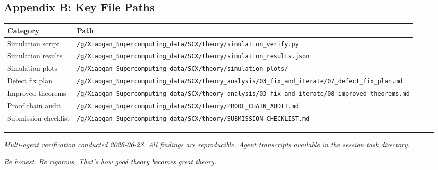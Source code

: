 \documentclass[
  12pt,
]{ctexart}
\begin{document}
\subsection{Appendix B: Key File Paths}\label{appendix-b-key-file-paths}

\begin{longtable}[]{@{}
  >{\raggedright\arraybackslash}p{}
  >{\raggedright\arraybackslash}p{}@{}}
\toprule\noalign{}
\begin{minipage}[b]{\linewidth}\raggedright
Category
\end{minipage} & \begin{minipage}[b]{\linewidth}\raggedright
Path
\end{minipage} \\
\midrule\noalign{}
\endhead
\bottomrule\noalign{}
\endlastfoot
Simulation script &
\texttt{/g/Xiaogan\_Supercomputing\_data/SCX/theory/simulation\_verify.py} \\
Simulation results &
\texttt{/g/Xiaogan\_Supercomputing\_data/SCX/theory/simulation\_results.json} \\
Simulation plots &
\texttt{/g/Xiaogan\_Supercomputing\_data/SCX/theory/simulation\_plots/} \\
Defect fix plan &
\texttt{/g/Xiaogan\_Supercomputing\_data/SCX/theory\_analysis/03\_fix\_and\_iterate/07\_defect\_fix\_plan.md} \\
Improved theorems &
\texttt{/g/Xiaogan\_Supercomputing\_data/SCX/theory\_analysis/03\_fix\_and\_iterate/08\_improved\_theorems.md} \\
Proof chain audit &
\texttt{/g/Xiaogan\_Supercomputing\_data/SCX/theory/PROOF\_CHAIN\_AUDIT.md} \\
Submission checklist &
\texttt{/g/Xiaogan\_Supercomputing\_data/SCX/theory/SUBMISSION\_CHECKLIST.md} \\
\end{longtable}

\begin{center}\rule{0.5\linewidth}{0.5pt}\end{center}

\emph{Multi-agent verification conducted 2026-06-28. All findings are
reproducible. Agent transcripts available in the session task
directory.}

\emph{Be honest. Be rigorous. That's how good theory becomes great
theory.}
\end{document}
